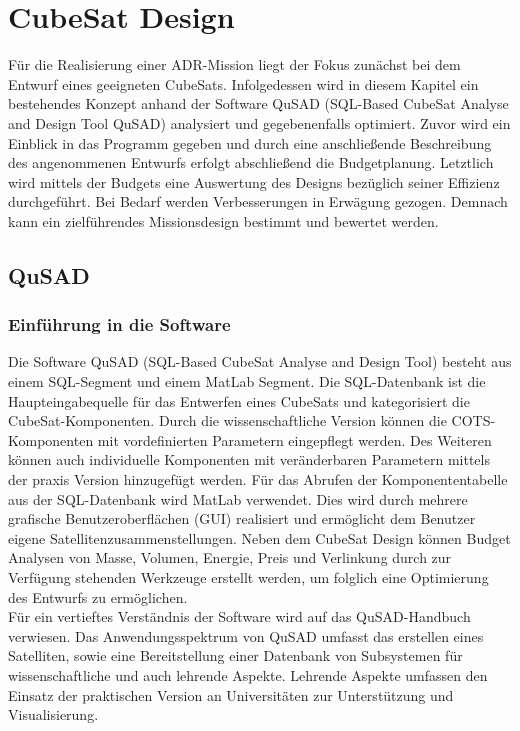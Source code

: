 \chapter{CubeSat Design}
Für die Realisierung einer ADR-Mission liegt der Fokus zunächst bei dem Entwurf eines geeigneten CubeSats. Infolgedessen wird in diesem Kapitel ein bestehendes Konzept \cite{Lettau.} anhand der Software QuSAD (SQL-Based CubeSat Analyse and Design Tool QuSAD) analysiert und gegebenenfalls optimiert. Zuvor wird ein Einblick in das Programm gegeben und durch eine anschließende Beschreibung des angenommenen Entwurfs erfolgt abschließend die Budgetplanung. Letztlich wird mittels der Budgets eine Auswertung des Designs bezüglich seiner Effizienz durchgeführt. Bei Bedarf werden Verbesserungen in Erwägung gezogen. Demnach kann ein zielführendes Missionsdesign bestimmt und bewertet werden.
		\section{QuSAD}
			\subsection{Einführung in die Software}
Die Software QuSAD (SQL-Based CubeSat Analyse and Design Tool) besteht aus einem SQL-Segment und einem MatLab Segment. Die SQL-Datenbank ist die Haupteingabequelle für das Entwerfen eines CubeSats und kategorisiert die CubeSat-Komponenten. Durch die wissenschaftliche Version können die COTS-Komponenten mit vordefinierten Parametern eingepflegt werden. Des Weiteren können auch individuelle Komponenten mit veränderbaren Parametern mittels der praxis Version hinzugefügt werden. Für das Abrufen der Komponententabelle aus der SQL-Datenbank wird MatLab verwendet. Dies wird durch mehrere grafische Benutzeroberflächen (GUI) realisiert und ermöglicht dem Benutzer eigene Satellitenzusammenstellungen. Neben dem CubeSat Design können Budget Analysen von Masse, Volumen, Energie, Preis und Verlinkung durch zur Verfügung stehenden Werkzeuge erstellt werden, um folglich eine Optimierung des Entwurfs zu ermöglichen. \cite{Farahvashi.2016b} \\
Für ein vertieftes Verständnis der Software wird auf das QuSAD-Handbuch \cite{Farahvashi.2016} verwiesen. Das Anwendungsspektrum von QuSAD umfasst das erstellen eines Satelliten, sowie eine Bereitstellung einer Datenbank von Subsystemen für wissenschaftliche und auch lehrende Aspekte. Lehrende Aspekte umfassen den Einsatz der praktischen Version an Universitäten zur Unterstützung und Visualisierung. \cite{Farahvashi.2016b}
